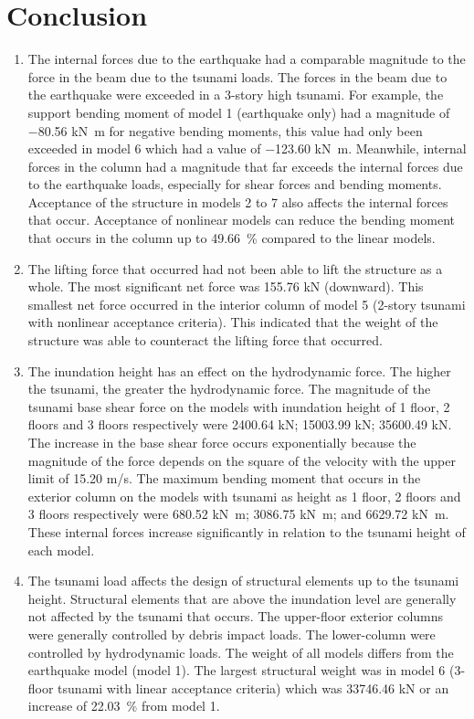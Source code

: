 \documentclass{cup-pan}
\begin{document}
\section{Conclusion}
\label{sec:conclusion}
\begin{enumerate}
\item{The internal forces due to the earthquake had a comparable magnitude to the force in the beam due to the tsunami loads. The forces in the beam due to the earthquake were exceeded in a 3-story high tsunami. For example, the support bending moment of model 1 (earthquake only) had a magnitude of \num{-80.56} \si{kN.m} for negative bending moments, this value had only been exceeded in model 6 which had a value of \num{-123.60} \si{kN.m}. Meanwhile, internal forces in the column had a magnitude that far exceeds the internal forces due to the earthquake loads, especially for shear forces and bending moments. Acceptance of the structure in models 2 to 7 also affects the internal forces that occur. Acceptance of nonlinear models can reduce the bending moment that occurs in the column up to \SI{49.66}{\percent} compared to the linear models.}

\item{The lifting force that occurred had not been able to lift the structure as a whole. The most significant net force was \num{155.76} \si{kN} (downward). This smallest net force occurred in the interior column of model 5 (2-story tsunami with nonlinear acceptance criteria). This indicated that the weight of the structure was able to counteract the lifting force that occurred.}

\item{The inundation height has an effect on the hydrodynamic force. The higher the tsunami, the greater the hydrodynamic force. The magnitude of the tsunami base shear force on the models with inundation height of 1 floor, 2 floors and 3 floors respectively were \num{2400.64} \si{kN}; \num{15003.99} \si{kN}; \num{35600.49} \si{kN}. The increase in the base shear force occurs exponentially because the magnitude of the force depends on the square of the velocity with the upper limit of \num{15.20} \si{m/s}. The maximum bending moment that occurs in the exterior column on the models with tsunami as height as 1 floor, 2 floors and 3 floors respectively were \num{680.52} \si{kN.m}; \num{3086.75} \si{kN.m}; and \num{6629.72} \si{kN.m}. These internal forces increase significantly in relation to the tsunami height of each model.
}

\item{The tsunami load affects the design of structural elements up to the tsunami height. Structural elements that are above the inundation level are generally not affected by the tsunami that occurs. The upper-floor exterior columns were generally controlled by debris impact loads. The lower-column were controlled by hydrodynamic loads. The weight of all models differs from the earthquake model (model 1). The largest structural weight was in model 6 (3-floor tsunami with linear acceptance criteria) which was \num{33746.46} \si{kN} or an increase of \SI{22.03}{\percent} from model 1.}
\end{enumerate}
\end{document}
